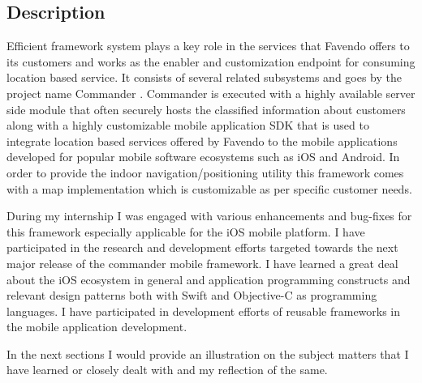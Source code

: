 \subsection{Description}
Efficient framework system plays a key role in the services that Favendo offers to its customers and works as the enabler and customization endpoint for consuming location based service. It consists of several related subsystems and goes by the project name Commander \cite{commanderfavendo}. Commander is executed with a highly available server side module that often securely hosts the classified information about customers along with a highly customizable mobile application SDK that is used to integrate location based services offered by Favendo to the mobile applications developed for popular mobile software ecosystems such as iOS and Android. In order to provide the indoor navigation/positioning utility this framework comes with a map implementation which is customizable as per specific customer needs.

\par During my internship I was engaged with various enhancements and bug-fixes for this framework especially applicable for the iOS mobile platform. I have participated in the research and development efforts targeted towards the next major release of the commander mobile framework. I have learned a great deal about the iOS ecosystem in general and application programming constructs and relevant design patterns both with Swift and Objective-C as programming languages. I have participated in development efforts of reusable frameworks in the mobile application development. 

\par In the next sections I would provide an illustration on the subject matters that I have learned or closely dealt with and my reflection of the same.